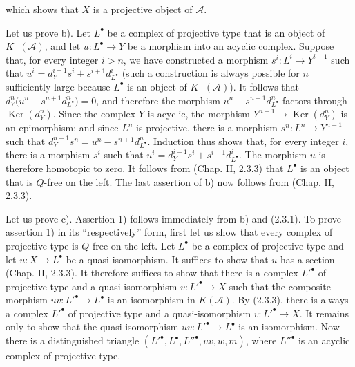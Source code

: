 \clearpage
{}%
\begingroup\small\setlength{\parskip}{0pt}\setlength{\emergencystretch}{1.5em}
\setlength{\abovedisplayskip}{4pt plus 2pt minus 2pt}%
\setlength{\belowdisplayskip}{4pt plus 2pt minus 2pt}%

which shows that $X$ is a projective object of $\mathcal A$.

Let us prove b). Let $L^\bullet$ be a complex of projective type that is an
object of $K^{-}(\mathcal A)$, and let
$u\colon L^\bullet\longrightarrow Y$ be a morphism into an acyclic
complex. Suppose that, for every integer $i>n$, we have constructed a
morphism $s^i\colon L^i\longrightarrow Y^{i-1}$ such that
$u^i=d_Y^{i-1}s^i+s^{i+1}d_{L^\bullet}^{i}$ (such a construction is always
possible for $n$ sufficiently large because
$L^\bullet$ is an object of $K^{-}(\mathcal A)$). It follows that
$d_Y^n\bigl(u^n-s^{n+1}d_{L^\bullet}^{n}\bigr)=0$, and therefore the
morphism $u^n-s^{n+1}d_{L^\bullet}^{n}$ factors through
$\operatorname{Ker}(d_Y^n)$. Since the complex $Y$ is acyclic, the
morphism $Y^{n-1}\longrightarrow\operatorname{Ker}(d_Y^n)$ is an
epimorphism; and since $L^n$ is projective, there is a morphism
$s^n\colon L^n\longrightarrow Y^{n-1}$ such that
$d_Y^{n-1}s^n=u^n-s^{n+1}d_{L^\bullet}^{n}$.
Induction thus shows that, for every integer $i$, there is a morphism $s^i$
such that $u^i=d_Y^{i-1}s^i+s^{i+1}d_{L^\bullet}^{i}$. The morphism $u$
is therefore homotopic to zero. It follows from (Chap. II, 2.3.3) that
$L^\bullet$ is an object that is $Q$-free on the left. The last assertion
of b) now follows from (Chap. II, 2.3.3).

Let us prove c). Assertion 1) follows immediately from b) and (2.3.1). To
prove assertion 1) in its ``respectively'' form, first let us show that
every complex of projective type is $Q$-free on the left. Let $L^\bullet$
be a complex of projective type and let
$u\colon X\longrightarrow L^\bullet$ be a quasi-isomorphism. It
suffices to show that $u$ has a section (Chap. II, 2.3.3). It
therefore suffices to show that there is a complex ${L'}^\bullet$ of
projective type and a quasi-isomorphism
$v\colon {L'}^\bullet\longrightarrow X$ such that the composite morphism
$uv\colon {L'}^\bullet\longrightarrow L^\bullet$ is an isomorphism
in $K(\mathcal A)$. By (2.3.3), there is always a complex ${L'}^\bullet$
of projective type and a quasi-isomorphism
$v\colon {L'}^\bullet\longrightarrow X$. It remains only to show that the
quasi-isomorphism
$uv\colon {L'}^\bullet\longrightarrow L^\bullet$ is an isomorphism.
Now there is a distinguished triangle
$({L'}^\bullet,L^\bullet,{L''}^\bullet,uv,w,m)$, where
${L''}^\bullet$ is an acyclic complex of projective type.


